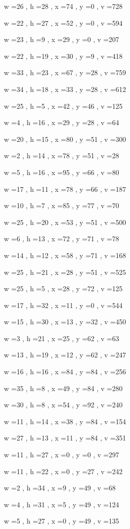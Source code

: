 \documentclass[11pt]{article}
\begin{document}
w =26 , h =28 , x =74 , y =0 , v =728
\par
w =22 , h =27 , x =52 , y =0 , v =594
\par
w =23 , h =9 , x =29 , y =0 , v =207
\par
w =22 , h =19 , x =30 , y =9 , v =418
\par
w =33 , h =23 , x =67 , y =28 , v =759
\par
w =34 , h =18 , x =33 , y =28 , v =612
\par
w =25 , h =5 , x =42 , y =46 , v =125
\par
w =4 , h =16 , x =29 , y =28 , v =64
\par
w =20 , h =15 , x =80 , y =51 , v =300
\par
w =2 , h =14 , x =78 , y =51 , v =28
\par
w =5 , h =16 , x =95 , y =66 , v =80
\par
w =17 , h =11 , x =78 , y =66 , v =187
\par
w =10 , h =7 , x =85 , y =77 , v =70
\par
w =25 , h =20 , x =53 , y =51 , v =500
\par
w =6 , h =13 , x =72 , y =71 , v =78
\par
w =14 , h =12 , x =58 , y =71 , v =168
\par
w =25 , h =21 , x =28 , y =51 , v =525
\par
w =25 , h =5 , x =28 , y =72 , v =125
\par
w =17 , h =32 , x =11 , y =0 , v =544
\par
w =15 , h =30 , x =13 , y =32 , v =450
\par
w =3 , h =21 , x =25 , y =62 , v =63
\par
w =13 , h =19 , x =12 , y =62 , v =247
\par
w =16 , h =16 , x =84 , y =84 , v =256
\par
w =35 , h =8 , x =49 , y =84 , v =280
\par
w =30 , h =8 , x =54 , y =92 , v =240
\par
w =11 , h =14 , x =38 , y =84 , v =154
\par
w =27 , h =13 , x =11 , y =84 , v =351
\par
w =11 , h =27 , x =0 , y =0 , v =297
\par
w =11 , h =22 , x =0 , y =27 , v =242
\par
w =2 , h =34 , x =9 , y =49 , v =68
\par
w =4 , h =31 , x =5 , y =49 , v =124
\par
w =5 , h =27 , x =0 , y =49 , v =135
\par
\newpage
\end{document}
